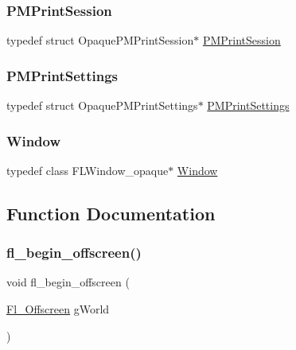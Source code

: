 \mbox{\label{mac_8_h_ac2b872188288fc60768520efc0ddf821}} 
\subsubsection{\texorpdfstring{P\+M\+Print\+Session}{PMPrintSession}}
{\footnotesize\ttfamily typedef struct Opaque\+P\+M\+Print\+Session$\ast$ \hyperlink{mac_8_h_ac2b872188288fc60768520efc0ddf821}{P\+M\+Print\+Session}}

\mbox{\label{mac_8_h_ae884d71f2d3fc33a29e1720245fb9de5}} 
\subsubsection{\texorpdfstring{P\+M\+Print\+Settings}{PMPrintSettings}}
{\footnotesize\ttfamily typedef struct Opaque\+P\+M\+Print\+Settings$\ast$ \hyperlink{mac_8_h_ae884d71f2d3fc33a29e1720245fb9de5}{P\+M\+Print\+Settings}}

\mbox{\label{mac_8_h_a213656d363e884b651cc92f58e863fc6}} 
\subsubsection{\texorpdfstring{Window}{Window}}
{\footnotesize\ttfamily typedef class F\+L\+Window\+\_\+opaque$\ast$ \hyperlink{mac_8_h_a213656d363e884b651cc92f58e863fc6}{Window}}



\subsection{Function Documentation}
\mbox{\label{mac_8_h_aac0378733483d10e73c694adf93f462c}} 
\subsubsection{\texorpdfstring{fl\+\_\+begin\+\_\+offscreen()}{fl\_begin\_offscreen()}}
{\footnotesize\ttfamily void fl\+\_\+begin\+\_\+offscreen (\begin{DoxyParamCaption}\item[{\hyperlink{mac_8_h_ad24d9679e17ea5ffa910ed355d4df340}{Fl\+\_\+\+Offscreen}}]{g\+World }\end{DoxyParamCaption})}

